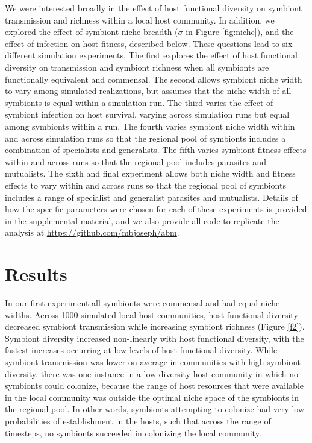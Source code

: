 \documentclass[12pt]{article}
\begin{document}
We were interested broadly in the effect of host functional diversity on symbiont transmission and richness within a local host community. 
In addition, we explored the effect of symbiont niche breadth ($\sigma$ in Figure \ref{fig:niche}), and the effect of infection on host fitness, described below. 
These questions lead to six different simulation experiments. 
The first explores the effect of host functional diversity on transmission and symbiont richness when all symbionts are functionally equivalent and commensal.
The second allows symbiont niche width to vary among simulated realizations, but assumes that the niche width of all symbionts is equal within a simulation run. 
The third varies the effect of symbiont infection on host survival, varying across simulation runs but equal among symbionts within a run. 
The fourth varies symbiont niche width within and across simulation runs so that the regional pool of symbionts includes a combination of specialists and generalists.
The fifth varies symbiont fitness effects within and across runs so that the regional pool includes parasites and mutualists.
The sixth and final experiment allows both niche width and fitness effects to vary within and across runs so that the regional pool of symbionts includes a range of specialist and generalist parasites and mutualists. 
Details of how the specific parameters were chosen for each of these experiments is provided in the supplemental material, and we also provide all code to replicate the analysis at \url{https://github.com/mbjoseph/abm}.

\section*{Results}

In our first experiment all symbionts were commensal and had equal niche widths. 
Across 1000 simulated local host communities, host functional diversity decreased symbiont transmission while increasing symbiont richness (Figure \ref{f2}). 
Symbiont diversity increased non-linearly with host functional diversity, with the fastest increases occurring at low levels of host functional diversity. 
While symbiont transmission was lower on average in communities with high symbiont diversity, there was one instance in a low-diversity host community in which no symbionts could colonize, because the range of host resources that were available in the local community was outside the optimal niche space of the symbionts in the regional pool. 
In other words, symbionts attempting to colonize had very low probabilities of establishment in the hosts, such that across the range of timesteps, no symbionts succeeded in colonizing the local community. 
\end{document}

